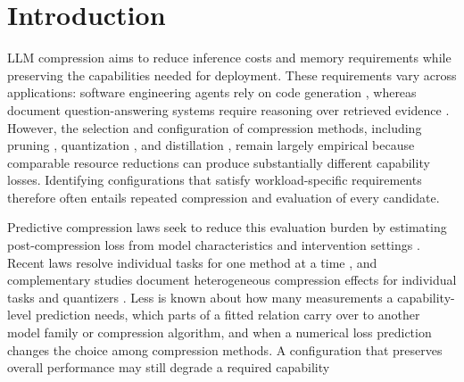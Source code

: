 \section{Introduction}
\label{sec:intro}

LLM compression aims to reduce inference costs and memory requirements while preserving the capabilities needed for deployment. These requirements vary across applications: software engineering agents rely on code generation \citep{jimenez2024swebench,yao2023react,schick2023toolformer,liu2024agentbench}, whereas document question-answering systems require reasoning over retrieved evidence \citep{yang2018hotpotqa,ho2020constructing,trivedi2022musique}. However, the selection and configuration of compression methods, including pruning \citep{lecun1989optimal,frantar2023sparsegpt,sun2023simple}, quantization \citep{dettmers2022llmint8,frantar2022gptq,lin2023awq}, and distillation \citep{hinton2015distilling,gu2023minillm,agarwal2023gkd}, remain largely empirical because comparable resource reductions can produce substantially different capability losses. Identifying configurations that satisfy workload-specific requirements therefore often entails repeated compression and evaluation of every candidate.

Predictive compression laws seek to reduce this evaluation burden by estimating post-compression loss from model characteristics and intervention settings \citep{frantar2023scaling,kumar2024scaling,panferov2025unified,zhang2024scaling,busbridge2025distillation}. Recent laws resolve individual tasks for one method at a time \citep{sengupta2025compression,zhou2026task}, and complementary studies document heterogeneous compression effects for individual tasks and quantizers \citep{jaiswal2023compressing,liu2025quantization}. Less is known about how many measurements a capability-level prediction needs, which parts of a fitted relation carry over to another model family or compression algorithm, and when a numerical loss prediction changes the choice among compression methods. A configuration that preserves overall performance may still degrade a required capability

